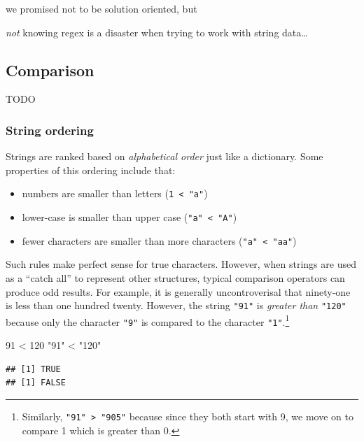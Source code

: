 \documentclass[
]{krantz}
\makeatletter
\newenvironment{Shaded}{\begin{snugshade}}{\end{snugshade}}
\newcommand{\DecValTok}[1]{\textcolor[rgb]{0.06,0.06,0.06}{#1}}
\newcommand{\SpecialCharTok}[1]{\textcolor[rgb]{0,0,0}{#1}}
\newcommand{\StringTok}[1]{\textcolor[rgb]{0.5,0.5,0.5}{#1}}
\providecommand{\tightlist}{%
  \setlength{\itemsep}{0pt}\setlength{\parskip}{0pt}}
\newenvironment{kframe}{%
\medskip{}
\setlength{\fboxsep}{.8em}
 \def\at@end@of@kframe{}%
 \ifinner\ifhmode%
  \def\at@end@of@kframe{\end{minipage}}%
  \begin{minipage}{\columnwidth}%
 \fi\fi%
 \def\FrameCommand##1{\hskip\@totalleftmargin \hskip-\fboxsep
 \colorbox{shadecolor}{##1}\hskip-\fboxsep
     \hskip-\linewidth \hskip-\@totalleftmargin \hskip\columnwidth}%
 \MakeFramed {\advance\hsize-\width
   \@totalleftmargin\z@ \linewidth\hsize
   \@setminipage}}%
 {\par\unskip\endMakeFramed%
 \at@end@of@kframe}
\renewenvironment{Shaded}{\begin{kframe}}{\end{kframe}}
\makeatother
\begin{document}
we promised not to be solution oriented, but

\emph{not} knowing regex is a disaster when trying to work with string data\ldots{}

\hypertarget{comparison-1}{%
\subsection{Comparison}\label{comparison-1}}

TODO

\hypertarget{string-ordering}{%
\subsubsection{String ordering}\label{string-ordering}}

Strings are ranked based on \emph{alphabetical order} just like a dictionary. Some properties of this ordering include that:

\begin{itemize}
\tightlist
\item
  numbers are smaller than letters (\texttt{1\ \textless{}\ "a"})
\item
  lower-case is smaller than upper case (\texttt{"a"\ \textless{}\ "A"})
\item
  fewer characters are smaller than more characters (\texttt{"a"\ \textless{}\ "aa"})
\end{itemize}

Such rules make perfect sense for true characters. However, when strings are used as a ``catch all'' to represent other structures, typical comparison operators can produce odd results. For example, it is generally uncontroverisal that ninety-one is less than one hundred twenty. However, the string \texttt{"91"} is \emph{greater than} \texttt{"120"} because only the character \texttt{"9"} is compared to the character \texttt{"1"}.\footnote{Similarly, \texttt{"91"\ \textgreater{}\ "905"} because since they both start with 9, we move on to compare 1 which is greater than 0.}

\begin{Shaded}
\begin{Highlighting}[]
\DecValTok{91} \SpecialCharTok{\textless{}} \DecValTok{120}
\StringTok{"91"} \SpecialCharTok{\textless{}} \StringTok{"120"}
\end{Highlighting}
\end{Shaded}

\begin{verbatim}
## [1] TRUE
## [1] FALSE
\end{verbatim}
\end{document}
